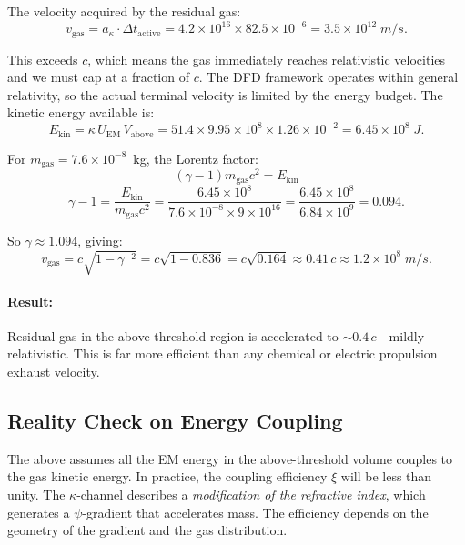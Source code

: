 \documentclass[amsmath,amssymb,aps,prd,superscriptaddress,nofootinbib]{revtex4-2}
\newcommand{\ka}{\kappa}
\begin{document}
The velocity acquired by the residual gas:
\begin{equation}\label{eq:v-gas}
v_\text{gas} = a_\kappa \cdot \Delta t_\text{active}
= 4.2 \times 10^{16} \times 82.5 \times 10^{-6}
= 3.5 \times 10^{12} \; \si{m/s}.
\end{equation}

This exceeds $c$, which means the gas immediately reaches relativistic
velocities and we must cap at a fraction of $c$. The DFD framework
operates within general relativity, so the actual terminal velocity
is limited by the energy budget. The kinetic energy available is:
\begin{equation}
E_\text{kin} = \ka \, U_\text{EM} \, V_\text{above}
= 51.4 \times 9.95 \times 10^8 \times 1.26 \times 10^{-2}
= 6.45 \times 10^8 \; \si{J}.
\end{equation}

For $m_\text{gas} = 7.6 \times 10^{-8}$~kg, the Lorentz factor:
\begin{equation}
(\gamma - 1)m_\text{gas}c^2 = E_\text{kin}
\end{equation}
\begin{equation}
\gamma - 1 = \frac{E_\text{kin}}{m_\text{gas}c^2}
= \frac{6.45 \times 10^8}{7.6 \times 10^{-8} \times 9 \times 10^{16}}
= \frac{6.45 \times 10^8}{6.84 \times 10^9} = 0.094.
\end{equation}

So $\gamma \approx 1.094$, giving:
\begin{equation}\label{eq:v-final}
\boxed{
v_\text{gas} = c\sqrt{1 - \gamma^{-2}}
= c\sqrt{1 - 0.836}
= c\sqrt{0.164}
\approx 0.41\,c
\approx 1.2 \times 10^8 \; \si{m/s}.
}
\end{equation}

\paragraph{Result:} Residual gas in the above-threshold region is
accelerated to $\sim 0.4\,c$---mildly relativistic. This is far more
efficient than any chemical or electric propulsion exhaust velocity.

\subsection{Reality Check on Energy Coupling}

The above assumes all the EM energy in the above-threshold volume
couples to the gas kinetic energy. In practice, the coupling efficiency
$\xi$ will be less than unity. The $\kappa$-channel describes a
\emph{modification of the refractive index}, which generates a
$\psi$-gradient that accelerates mass. The efficiency depends on the
geometry of the gradient and the gas distribution.
\end{document}
